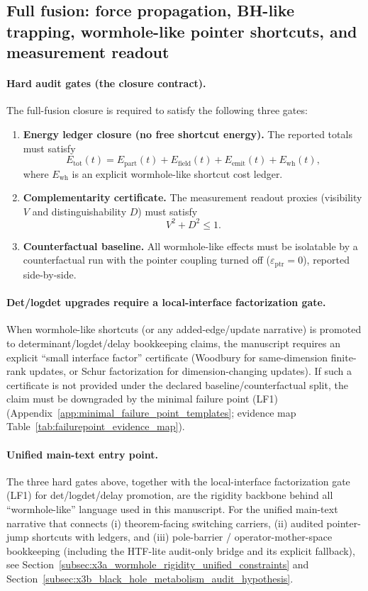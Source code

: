 \subsection{Full fusion: force propagation, BH-like trapping, wormhole-like pointer shortcuts, and measurement readout}
\label{subsec:full_fusion_maintext}



\paragraph{Hard audit gates (the closure contract).}
\InterfaceTag The full-fusion closure is required to satisfy the following three gates:
\begin{enumerate}
\item \textbf{Energy ledger closure (no free shortcut energy).}
The reported totals must satisfy
\[
E_{\mathrm{tot}}(t)=E_{\mathrm{part}}(t)+E_{\mathrm{field}}(t)+E_{\mathrm{emit}}(t)+E_{\mathrm{wh}}(t),
\]
where $E_{\mathrm{wh}}$ is an explicit wormhole-like shortcut cost ledger.
\item \textbf{Complementarity certificate.}
The measurement readout proxies (visibility $V$ and distinguishability $D$) must satisfy
\[
V^2+D^2\le 1.
\]
\item \textbf{Counterfactual baseline.}
All wormhole-like effects must be isolatable by a counterfactual run with the pointer coupling turned off
($\varepsilon_{\mathrm{ptr}}=0$), reported side-by-side.
\end{enumerate}

\paragraph{Det/logdet upgrades require a local-interface factorization gate.}
\AuditTag When wormhole-like shortcuts (or any added-edge/update narrative) is promoted to determinant/logdet/delay bookkeeping claims,
the manuscript requires an explicit ``small interface factor'' certificate (Woodbury for same-dimension finite-rank updates, or Schur factorization for dimension-changing updates).
If such a certificate is not provided under the declared baseline/counterfactual split, the claim must be downgraded by the minimal failure point (LF1)
(Appendix~\ref{app:minimal_failure_point_templates}; evidence map Table~\ref{tab:failurepoint_evidence_map}).

\paragraph{Unified main-text entry point.}
\AuditTag The three hard gates above, together with the local-interface factorization gate (LF1) for det/logdet/delay promotion, are the rigidity backbone behind all ``wormhole-like'' language used in this manuscript.
For the unified main-text narrative that connects (i) theorem-facing switching carriers, (ii) audited pointer-jump shortcuts with ledgers,
and (iii) pole-barrier / operator-mother-space bookkeeping (including the HTF-lite audit-only bridge and its explicit fallback),
see Section~\ref{subsec:x3a_wormhole_rigidity_unified_constraints} and Section~\ref{subsec:x3b_black_hole_metabolism_audit_hypothesis}.

